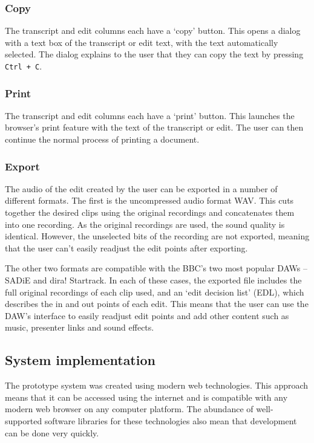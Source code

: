 \subsubsection{Copy}
The transcript and edit columns each have a `copy' button. This opens a dialog
with a text box of the transcript or edit text, with the text automatically
selected. The dialog explains to the user that they can copy the text by
pressing \texttt{Ctrl + C}.

\subsubsection{Print}
The transcript and edit columns each have a `print' button. This launches the
browser's print feature with the text of the transcript or edit. The user can
then continue the normal process of printing a document.

\subsubsection{Export}
The audio of the edit created by the user can be exported in a number of
different formats. The first is the uncompressed audio format WAV. This cuts
together the desired clips using the original recordings and concatenates them
into one recording. As the original recordings are used, the sound quality is
identical. However, the unselected bits of the recording are not exported,
meaning that the user can't easily readjust the edit points after exporting.

The other two formats are compatible with the BBC's two most popular DAWs --
SADiE and dira! Startrack. In each of these cases, the exported file includes
the full original recordings of each clip used, and an `edit decision list'
(EDL), which describes the in and out points of each edit. This means that the
user can use the DAW's interface to easily readjust edit points and add other
content such as music, presenter links and sound effects.

\subsection{System implementation}
The prototype system was created using modern web technologies. This approach
means that it can be accessed using the internet and is compatible with any
modern web browser on any computer platform. The abundance of well-supported
software libraries for these technologies also mean that development can be
done very quickly.

